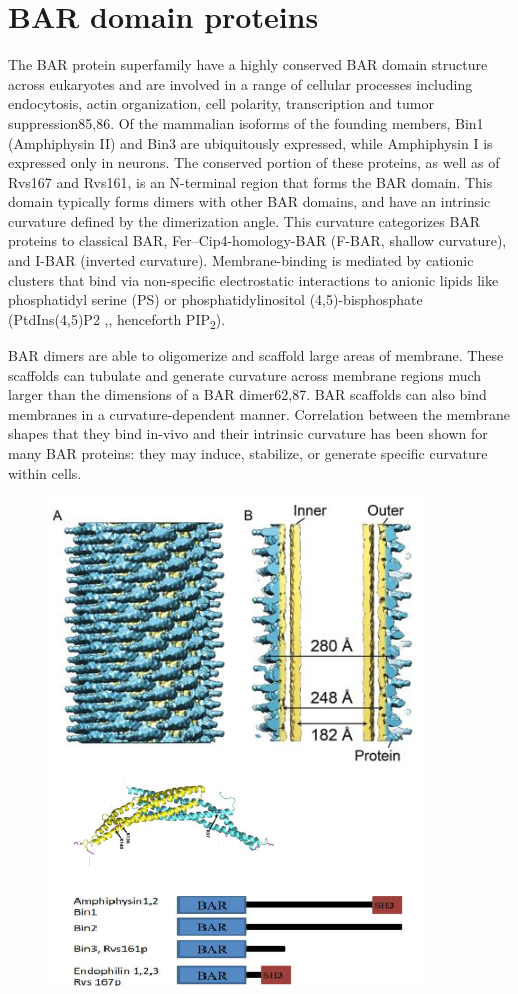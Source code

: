 		
\section{BAR domain proteins}
	
The BAR protein superfamily have a highly conserved BAR domain structure across eukaryotes and are involved in a range of cellular processes including endocytosis, actin organization, cell polarity, transcription and tumor suppression85,86. 
Of the mammalian isoforms of the founding members, Bin1 (Amphiphysin II) and Bin3 are ubiquitously expressed, while Amphiphysin I is expressed only in neurons. The conserved portion of these proteins, as well as of Rvs167 and Rvs161, is an N-terminal region that forms the BAR domain. This domain typically forms dimers with other BAR domains, and have an intrinsic curvature defined by the dimerization angle. This curvature categorizes BAR proteins to classical BAR, Fer–Cip4-homology-BAR (F-BAR, shallow curvature), and I-BAR (inverted curvature). Membrane-binding is mediated by cationic clusters that bind via non-specific electrostatic interactions to anionic lipids like phosphatidyl serine (PS) or phosphatidylinositol (4,5)-bisphosphate (PtdIns(4,5)P2 ,, henceforth PIP\textsubscript{2}).

\vspace{5mm}
BAR dimers are able to oligomerize and scaffold large areas of membrane. These scaffolds can tubulate and generate curvature across membrane regions much larger than the dimensions of a BAR dimer62,87. BAR scaffolds can also bind membranes in a curvature-dependent manner. Correlation between the membrane shapes that they bind in-vivo and their intrinsic curvature has been shown for many BAR proteins: they may induce, stabilize, or generate specific curvature within cells. 

		
\begin{figure}[H]
	\centering
	\includegraphics[scale=0.5]{figures/intro/BARS2}
	\end{figure}

